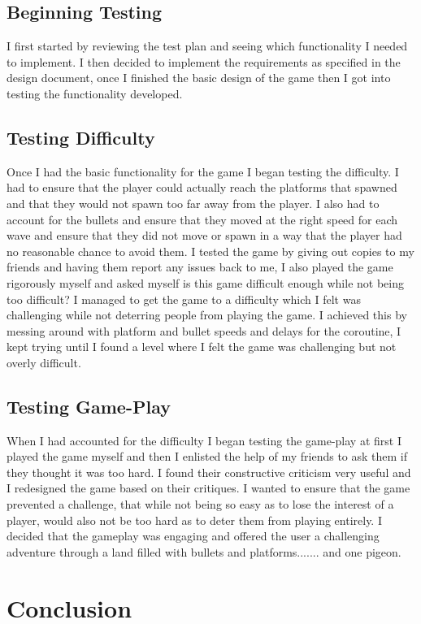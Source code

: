 \documentclass{report}
\begin{document}
\section{Beginning Testing}
I first started by reviewing the test plan and seeing which functionality I needed to implement. I then decided to implement the requirements as specified in the design document, once I finished the basic design of the game then I got into testing the functionality developed.
\section{Testing Difficulty}
Once I had the basic functionality for the game I began testing the difficulty.  I had to ensure that the player could actually reach the platforms that spawned and that they would not spawn too far away from the player.  I also had to account for the bullets and ensure that they moved at the right speed for each wave and ensure that they did not move or spawn in a way that the player had no reasonable chance to avoid them.  I tested the game by giving out copies to my friends and having them report any issues back to me, I also played the game rigorously myself and asked myself is this game difficult enough while not being too difficult? I managed to get the game to a difficulty which I felt was challenging while not deterring people from playing the game. I achieved this by messing around with platform and bullet speeds and delays for the coroutine, I kept trying until I found a level where I felt the game was challenging but not overly difficult.
\section{Testing Game-Play}
When I had accounted for the difficulty I began testing the game-play at first I played the game myself and then I enlisted the help of my friends to ask them if they thought it was too hard.  I found their constructive criticism very useful and I redesigned the game based on their critiques.  I wanted to ensure that the game prevented a challenge, that while not being so easy as to lose the interest of a player, would also not be too hard as to deter them from playing entirely.  I decided that the gameplay was engaging and offered the user a challenging adventure through a land filled with bullets and platforms....... and one pigeon.
\chapter{Conclusion}
\end{document}
